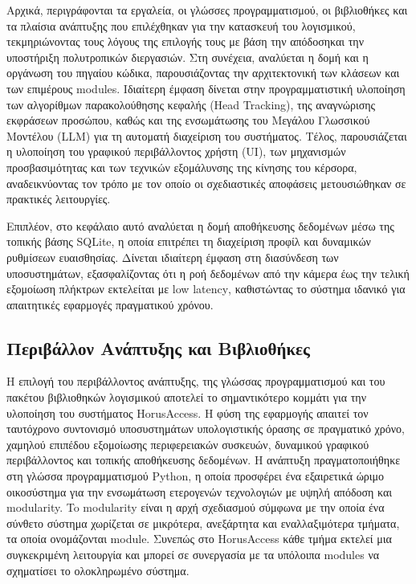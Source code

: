 \documentclass[twoside, a4paper, 11pt]{article}
\newcommand{\textlatin}[1]{\textenglish{#1}}
\begin{document}
Αρχικά, περιγράφονται τα εργαλεία, οι γλώσσες προγραμματισμού, 
οι βιβλιοθήκες και τα πλαίσια ανάπτυξης που επιλέχθηκαν για την κατασκευή του λογισμικού, 
τεκμηριώνοντας τους λόγους της επιλογής τους με βάση την απόδοσηκαι την υποστήριξη πολυτροπικών διεργασιών. 
Στη συνέχεια, αναλύεται η δομή και η οργάνωση του πηγαίου κώδικα, παρουσιάζοντας την αρχιτεκτονική των κλάσεων και των επιμέρους 
modules. Ιδιαίτερη έμφαση δίνεται στην προγραμματιστική υλοποίηση των αλγορίθμων παρακολούθησης 
κεφαλής (Head Tracking), της αναγνώρισης εκφράσεων προσώπου, 
καθώς και της ενσωμάτωσης του Μεγάλου Γλωσσικού Μοντέλου (LLM) για τη αυτοματή διαχείριση του συστήματος. 
Τέλος, παρουσιάζεται η υλοποίηση του γραφικού περιβάλλοντος χρήστη (UI), των μηχανισμών προσβασιμότητας και των τεχνικών
 εξομάλυνσης της κίνησης του κέρσορα, αναδεικνύοντας τον τρόπο με τον οποίο οι σχεδιαστικές αποφάσεις μετουσιώθηκαν σε πρακτικές
  λειτουργίες.

Επιπλέον, στο κεφάλαιο αυτό αναλύεται η δομή αποθήκευσης δεδομένων μέσω της τοπικής βάσης \textlatin{SQLite},
 η οποία επιτρέπει τη διαχείριση προφίλ και δυναμικών ρυθμίσεων ευαισθησίας. 
 Δίνεται ιδιαίτερη έμφαση στη διασύνδεση των υποσυστημάτων, εξασφαλίζοντας ότι η ροή δεδομένων από την κάμερα έως την 
 τελική εξομοίωση πλήκτρων εκτελείται με \textlatin{low latency}, καθιστώντας το σύστημα ιδανικό για
  απαιτητικές εφαρμογές πραγματικού χρόνου.

\subsection{Περιβάλλον Ανάπτυξης και Βιβλιοθήκες}

Η επιλογή του περιβάλλοντος ανάπτυξης, της γλώσσας προγραμματισμού και του 
πακέτου βιβλιοθηκών λογισμικού αποτελεί το σημαντικότερο κομμάτι 
για την υλοποίηση του συστήματος HorusAccess. 
Η φύση της εφαρμογής απαιτεί τον ταυτόχρονο συντονισμό υποσυστημάτων υπολογιστικής όρασης 
σε πραγματικό χρόνο, χαμηλού επιπέδου εξομοίωσης περιφερειακών συσκευών, 
δυναμικού γραφικού περιβάλλοντος και τοπικής αποθήκευσης δεδομένων. Η ανάπτυξη 
πραγματοποιήθηκε στη γλώσσα προγραμματισμού Python, η οποία προσφέρει ένα εξαιρετικά 
ώριμο οικοσύστημα για την ενσωμάτωση ετερογενών τεχνολογιών με υψηλή απόδοση και modularity.
To modularity είναι η αρχή σχεδιασμού σύμφωνα με την οποία ένα σύνθετο σύστημα χωρίζεται 
σε μικρότερα, ανεξάρτητα και εναλλαξιμότερα τμήματα, τα οποία ονομάζονται module.
Συνεπώς στο HorusAccess κάθε τμήμα εκτελεί μια συγκεκριμένη λειτουργία και μπορεί σε συνεργασία με τα υπόλοιπα modules να σχηματίσει το ολοκληρωμένο σύστημα.
\end{document}
